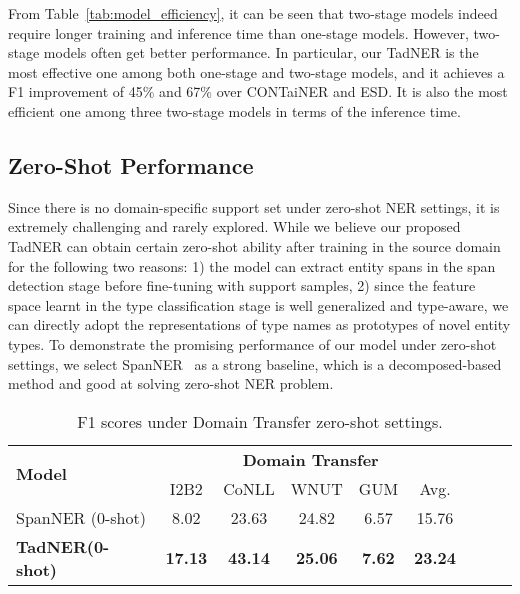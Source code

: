 \documentclass[11pt]{article}
\newcommand{\ours}{{TadNER}\xspace}
\begin{document}
From Table~\ref{tab:model_efficiency}, it can be seen that two-stage models indeed require longer training and inference time than one-stage models. 
However, two-stage models often get better performance. 
In particular, our \ours is the most effective one among both one-stage and two-stage models, and it achieves a F1 improvement of 45\% and 67\% over CONTaiNER and ESD.
It is also the most efficient one among three two-stage models in terms of the inference time.


\subsection{Zero-Shot Performance}\label{appendix_zero}
Since there is no domain-specific support set under zero-shot NER settings, it is extremely challenging and rarely explored.
While we believe our proposed \ours can obtain certain zero-shot ability after training in the source domain for the following two reasons: 1) the model can extract entity spans in the span detection stage before fine-tuning with support samples, 2) since the feature space learnt in the type classification stage is well generalized and type-aware, we can directly adopt the representations of type names as prototypes of novel entity types.
To demonstrate the promising performance of our model under zero-shot settings, we select SpanNER~\cite{wang2021learning-from-description} as a strong baseline, which is a decomposed-based method and good at solving zero-shot NER problem.

\begin{table}[htb]
    \small
    \centering
    \setlength{\tabcolsep}{1mm}  
    {
    \begin{tabular}{lcccccccc}
    \toprule
        \multirow{2}{*}{\textbf{Model}}  & \multicolumn{5}{c}{\textbf{Domain Transfer}}\\
        \cmidrule(lr){2-6} 
        & {I2B2} & {CoNLL}  & {WNUT} & {GUM} & {Avg.}\\
         \cmidrule(lr){1-1}\cmidrule(lr){2-6} 


        SpanNER (0-shot)  & 8.02 & 23.63  & 24.82 & 6.57 & 15.76\\
        
        \textbf{\ours (0-shot)}  & \textbf{17.13}& \textbf{43.14} & \textbf{25.06}& \textbf{7.62} & \textbf{23.24}\\
        \bottomrule
    \end{tabular}
    }
    \caption{F1 scores under Domain Transfer zero-shot settings.}
    \label{tab:performance_zero_shot}
\end{table}
\end{document}
